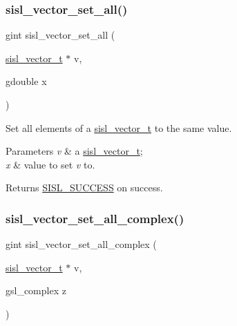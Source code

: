 \subsubsection{\texorpdfstring{sisl\+\_\+vector\+\_\+set\+\_\+all()}{sisl\_vector\_set\_all()}}
{\footnotesize\ttfamily gint sisl\+\_\+vector\+\_\+set\+\_\+all (\begin{DoxyParamCaption}\item[{\mbox{\hyperlink{group__vector_gacbac585492f5005f05f0c0b8463039be}{sisl\+\_\+vector\+\_\+t}} $\ast$}]{v,  }\item[{gdouble}]{x }\end{DoxyParamCaption})}

Set all elements of a \mbox{\hyperlink{group__vector_gacbac585492f5005f05f0c0b8463039be}{sisl\+\_\+vector\+\_\+t}} to the same value.


\begin{DoxyParams}{Parameters}
{\em v} & a \mbox{\hyperlink{group__vector_gacbac585492f5005f05f0c0b8463039be}{sisl\+\_\+vector\+\_\+t}}; \\
\hline
{\em x} & value to set {\itshape v} to.\\
\hline
\end{DoxyParams}
\begin{DoxyReturn}{Returns}
\mbox{\hyperlink{group__status_gga82c112a16803c9ddebc065a1b0f16287a60b9f04752a2c4dd6214f8a4fd7d913b}{S\+I\+S\+L\+\_\+\+S\+U\+C\+C\+E\+SS}} on success. 
\end{DoxyReturn}
\mbox{\label{group__vector_ga033227a0e85218e8bda5aeacf7ec539e}} 
\subsubsection{\texorpdfstring{sisl\+\_\+vector\+\_\+set\+\_\+all\+\_\+complex()}{sisl\_vector\_set\_all\_complex()}}
{\footnotesize\ttfamily gint sisl\+\_\+vector\+\_\+set\+\_\+all\+\_\+complex (\begin{DoxyParamCaption}\item[{\mbox{\hyperlink{group__vector_gacbac585492f5005f05f0c0b8463039be}{sisl\+\_\+vector\+\_\+t}} $\ast$}]{v,  }\item[{gsl\+\_\+complex}]{z }\end{DoxyParamCaption})}

